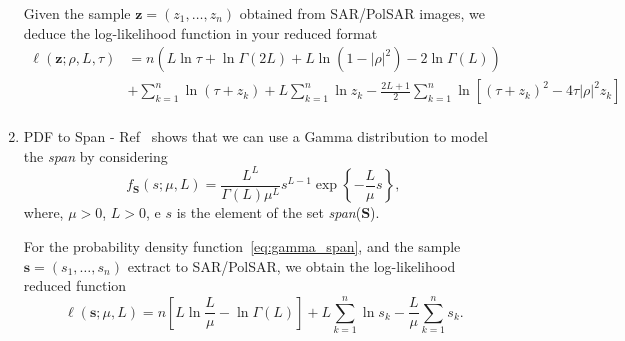 \documentclass[remotesensing,article,submit,pdftex,moreauthors]{Definitions/mdpi}
\begin{document}
\begin{enumerate}[leftmargin=*,labelsep=4.9mm]
Given the sample $\bm z = (z_1,\dots,z_n)$ obtained from SAR/PolSAR images, we deduce the log-likelihood function in your reduced format
\begin{equation}
\begin{split}
    \ell(\bm z;\rho, L, \tau)&=n\left(L\ln\tau +\ln\Gamma(2L)+L\ln(1-|\rho|^2)-2\ln\Gamma(L)\right)\\
                         &+\sum_{k=1}^{n}\ln(\tau+z_k)+L\sum_{k=1}^{n}\ln z_k-\frac{2L+1}{2}\sum_{k=1}^{n} \ln\left[(\tau+z_k)^2-4\tau|\rho|^2z_k\right]\\
\end{split}
\label{eq:log_like_ratio_intensidade_red_tau_z}
 \end{equation} 
%
%
 
\item PDF to Span -
Ref~\cite{fwzjn} shows that we can use a Gamma distribution to model the \textit{span} by considering
\begin{equation}
	f_{\mathbf{S}}(s;\mu,L)=\frac{L^{L}}{\Gamma(L)\mu^{L}} s^{L-1}\exp\left\{-\frac{L}{\mu}s\right\},
 \label{eq:gamma_span}
\end{equation}
where, $\mu>0$, $L>0$, e $s$ is the element of the set \textit{span}($\mathbf{S}$).

For the probability density function~\eqref{eq:gamma_span}, and the sample $\bm s = (s_1,\dots,s_n)$ extract to SAR/PolSAR, we obtain the log-likelihood reduced function
\begin{equation}
\ell(\bm s;\mu, L) = 
n \left[L\ln \frac{L}{\mu} - \ln \Gamma(L)\right]
+L \sum_{k=1}^{n}\ln s_k -\frac{L}{\mu}\sum_{k=1}^{n} s_k.
\label{eq:LogLikelihoodGamma_red_span}
\end{equation}
\end{enumerate}
%
\end{document}
